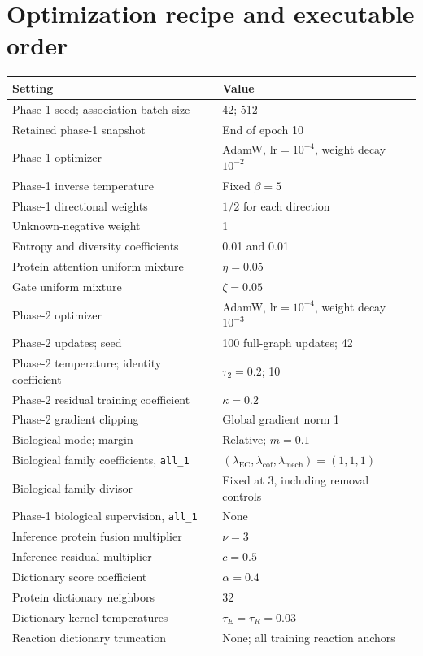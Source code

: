 \section{Optimization recipe and executable order}
\label{app:v4-recipe}
\begin{longtable}{p{}p{}}
\toprule
Setting & Value\\
\midrule
\endhead
Phase-1 seed; association batch size & 42; 512\\
Retained phase-1 snapshot & End of epoch 10\\
Phase-1 optimizer & AdamW, $\mathrm{lr}=10^{-4}$, weight decay $10^{-2}$\\
Phase-1 inverse temperature & Fixed $\beta=5$\\
Phase-1 directional weights & $1/2$ for each direction\\
Unknown-negative weight & 1\\
Entropy and diversity coefficients & 0.01 and 0.01\\
Protein attention uniform mixture & $\eta=0.05$\\
Gate uniform mixture & $\zeta=0.05$\\
Phase-2 optimizer & AdamW, $\mathrm{lr}=10^{-4}$, weight decay $10^{-3}$\\
Phase-2 updates; seed & 100 full-graph updates; 42\\
Phase-2 temperature; identity coefficient & $\tau_2=0.2$; 10\\
Phase-2 residual training coefficient & $\kappa=0.2$\\
Phase-2 gradient clipping & Global gradient norm 1\\
Biological mode; margin & Relative; $m=0.1$\\
Biological family coefficients, \texttt{all\_1} & $(\lambda_{\mathrm{EC}},\lambda_{\mathrm{cof}},\lambda_{\mathrm{mech}})=(1,1,1)$\\
Biological family divisor & Fixed at 3, including removal controls\\
Phase-1 biological supervision, \texttt{all\_1} & None\\
Inference protein fusion multiplier & $\nu=3$\\
Inference residual multiplier & $c=0.5$\\
Dictionary score coefficient & $\alpha=0.4$\\
Protein dictionary neighbors & 32\\
Dictionary kernel temperatures & $\tau_E=\tau_R=0.03$\\
Reaction dictionary truncation & None; all training reaction anchors\\
\bottomrule
\end{longtable}

